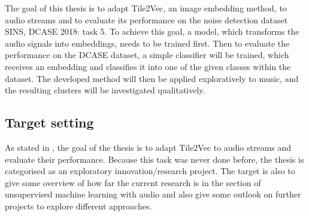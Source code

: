 The goal of this thesis is to adapt Tile2Vec, an image embedding method, to audio streams and to evaluate its performance on the noise detection dataset \flqq SINS, DCASE 2018: task 5\frqq. 
\newline
\newline
To achieve this goal, a model, which transforms the audio signals into embeddings, needs to be trained first. Then to evaluate the performance on the DCASE dataset, a simple classifier will be trained, which receives an embedding and classifies it into one of the given classes within the dataset. The developed method will then be applied exploratively to music, and the resulting clusters will be investigated qualitatively.

\subsection{Target setting}
\label{sub:Target-Setting}

As stated in , the goal of the thesis is to adapt Tile2Vec to audio streams and evaluate their performance. Because this task was never done before, the thesis is categorised as an exploratory innovation/research project. The target is also to give some overview of how far the current research is in the section of unsupervised machine learning with audio and also give some outlook on further projects to explore different approaches.